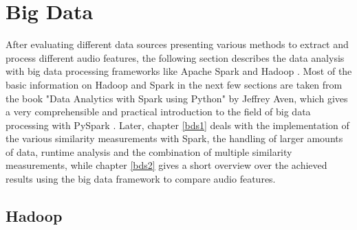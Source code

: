 
\section{Big Data}\label{bdf}

After evaluating different data sources presenting various methods to extract and process different audio features, the following section describes the data analysis with big data processing frameworks like Apache Spark \cite{spark} and Hadoop \cite{hadoop}. Most of the basic information on Hadoop and Spark in the next few sections are taken from the book "Data Analytics with Spark using Python" by Jeffrey Aven, which gives a very comprehensible and practical introduction to the field of big data processing with PySpark \cite{sparkbook1}. Later, chapter \ref{bds1} deals with the implementation of the various similarity measurements with Spark, the handling of larger amounts of data, runtime analysis and the combination of multiple similarity measurements, while chapter \ref{bds2} gives a short overview over the achieved results using the big data framework to compare audio features. 

\subsection{Hadoop}

